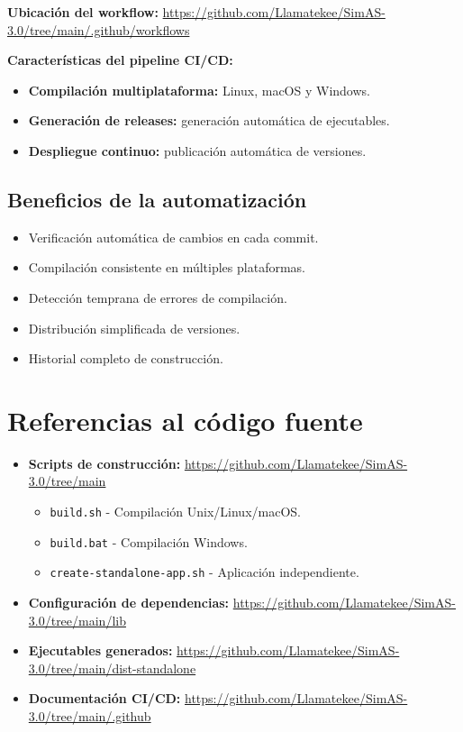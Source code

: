 \textbf{Ubicación del workflow:} \url{https://github.com/Llamatekee/SimAS-3.0/tree/main/.github/workflows}

\textbf{Características del pipeline CI/CD:}

\begin{itemize}
    \item \textbf{Compilación multiplataforma:} Linux, macOS y Windows.
    \item \textbf{Generación de releases:} generación automática de ejecutables.
    \item \textbf{Despliegue continuo:} publicación automática de versiones.
\end{itemize}

\subsection{Beneficios de la automatización}

\begin{itemize}
    \item Verificación automática de cambios en cada commit.
    \item Compilación consistente en múltiples plataformas.
    \item Detección temprana de errores de compilación.
    \item Distribución simplificada de versiones.
    \item Historial completo de construcción.
\end{itemize}

\section{Referencias al código fuente}

\begin{itemize}
    \item \textbf{Scripts de construcción:} \url{https://github.com/Llamatekee/SimAS-3.0/tree/main}
    \begin{itemize}
        \item \texttt{build.sh} - Compilación Unix/Linux/macOS.
        \item \texttt{build.bat} - Compilación Windows.
        \item \texttt{create-standalone-app.sh} - Aplicación independiente.
    \end{itemize}
    \item \textbf{Configuración de dependencias:} \url{https://github.com/Llamatekee/SimAS-3.0/tree/main/lib}
    \item \textbf{Ejecutables generados:} \url{https://github.com/Llamatekee/SimAS-3.0/tree/main/dist-standalone}
    \item \textbf{Documentación CI/CD:} \url{https://github.com/Llamatekee/SimAS-3.0/tree/main/.github}
\end{itemize}


